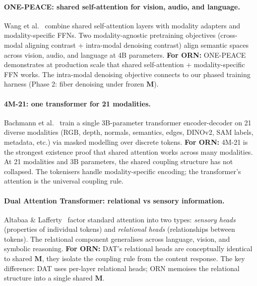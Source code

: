 \documentclass[11pt, a4paper]{article}
\newcommand{\M}{\mathbf{M}}
\theoremstyle{plain}
\theoremstyle{remark}
\begin{document}
\paragraph{ONE-PEACE: shared self-attention for vision, audio, and language.}
Wang et al.~\cite{wang2023onepeace} combine shared self-attention layers with modality adapters and modality-specific FFNs.
Two modality-agnostic pretraining objectives (cross-modal aligning contrast + intra-modal denoising contrast) align semantic spaces across vision, audio, and language at 4B parameters.
\textbf{For ORN:} ONE-PEACE demonstrates at production scale that shared self-attention + modality-specific FFN works.
The intra-modal denoising objective connects to our phased training harness (Phase 2: fiber denoising under frozen $\M$).

\paragraph{4M-21: one transformer for 21 modalities.}
Bachmann et al.~\cite{bachmann2024fourm} train a single 3B-parameter transformer encoder-decoder on 21 diverse modalities (RGB, depth, normals, semantics, edges, DINOv2, SAM labels, metadata, etc.) via masked modelling over discrete tokens.
\textbf{For ORN:} 4M-21 is the strongest existence proof that shared attention works across many modalities.
At 21 modalities and 3B parameters, the shared coupling structure has not collapsed.
The tokenisers handle modality-specific encoding; the transformer's attention is the universal coupling rule.

\paragraph{Dual Attention Transformer: relational vs sensory information.}
Altabaa \& Lafferty~\cite{altabaa2024dat} factor standard attention into two types: \emph{sensory heads} (properties of individual tokens) and \emph{relational heads} (relationships between tokens).
The relational component generalises across language, vision, and symbolic reasoning.
\textbf{For ORN:} DAT's relational heads are conceptually identical to shared $\M$, they isolate the coupling rule from the content response.
The key difference: DAT uses per-layer relational heads; ORN memoises the relational structure into a single shared $\M$.
\end{document}
